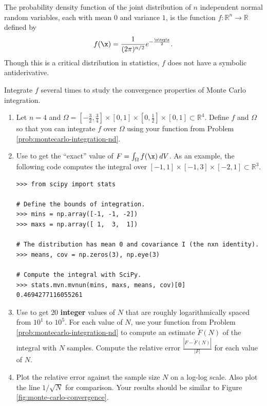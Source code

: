 \begin{problem}
The probability density function of the joint distribution of $n$ independent normal random variables, each with mean $0$ and variance $1$, is the function $f:\mathbb{R}^n\rightarrow\mathbb{R}$ defined by
\[
f(\x) = \frac{1}{(2 \pi)^{n/2}} e^{- \frac{\x\trp\x}{2}}.
\]
Though this is a critical distribution in statistics, $f$ does not have a symbolic antiderivative.

Integrate $f$ several times to study the convergence properties of Monte Carlo integration.

\begin{enumerate}
\item Let $n=4$ and $\Omega=[-\frac{3}{2}, \frac{3}{4}]\times[0,1]\times[0, \frac{1}{2}]\times[0,1] \subset \mathbb{R}^4$.
Define $f$ and $\Omega$ so that you can integrate $f$ over $\Omega$ using your function from Problem \ref{prob:montecarlo-integration-nd}.

\item Use  to get the ``exact'' value of $F = \int_\Omega f(\x)\:dV$.
As an example, the following code computes the integral over $[-1,1]\times [-1,3]\times[-2,1] \subset \mathbb{R}^3$.
\begin{lstlisting}
>>> from scipy import stats

# Define the bounds of integration.
>>> mins = np.array([-1, -1, -2])
>>> maxs = np.array([ 1,  3,  1])

# The distribution has mean 0 and covariance I (the nxn identity).
>>> means, cov = np.zeros(3), np.eye(3)

# Compute the integral with SciPy.
>>> stats.mvn.mvnun(mins, maxs, means, cov)[0]
0.4694277116055261
\end{lstlisting}

\item Use  to get $20$ \textbf{integer} values of $N$ that are roughly logarithmically spaced from $10^1$ to $10^5$.
For each value of $N$, use your function from Problem \ref{prob:montecarlo-integration-nd} to compute an estimate $\tilde{F}(N)$ of the integral with $N$ samples.
Compute the relative error $\frac{|F - \tilde{F}(N)|}{|F|}$ for each value of $N$.

\item Plot the relative error against the sample size $N$ on a log-log scale.
Also plot the line $1/\sqrt{N}$ for comparison.
Your results should be similar to Figure \ref{fig:monte-carlo-convergence}.
\end{enumerate}
\end{problem}

